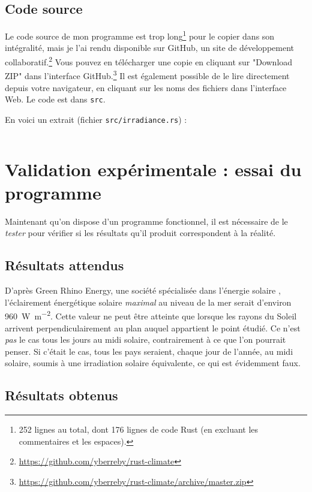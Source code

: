 \documentclass[12pt]{article}
\begin{document}
\FloatBarrier
\subsection{Code source}

Le code source de mon programme est trop long\footnote{252 lignes au total, dont 176 lignes de code Rust (en excluant les commentaires et les espaces).} pour le copier dans son intégralité, mais je l'ai rendu disponible sur GitHub, un site de développement collaboratif.\footnote{\url{https://github.com/yberreby/rust-climate}}
Vous pouvez en télécharger une copie en cliquant sur "Download ZIP" dans l'interface GitHub.\footnote{\url{https://github.com/yberreby/rust-climate/archive/master.zip}}
Il est également possible de le lire directement depuis votre navigateur, en cliquant sur les noms des fichiers dans l'interface Web.
Le code est dans \texttt{src}.

En voici un extrait (fichier \texttt{src/irradiance.rs}) :

\inputminted[linenos]{rust}{rust-climate/src/irradiance.rs}



\clearpage
\section{Validation expérimentale : essai du programme}

Maintenant qu'on dispose d'un programme fonctionnel, il est nécessaire de le \emph{tester} pour vérifier si les résultats qu'il produit correspondent à la réalité.

\subsection{Résultats attendus}

D'après Green Rhino Energy, une société spécialisée dans l'énergie solaire \cite{green_rhino_irradiance}, l'éclairement énergétique solaire \emph{maximal} au niveau de la mer serait d'environ \SI{960}{\watt\per\square\meter}.
Cette valeur ne peut être atteinte que lorsque les rayons du Soleil arrivent perpendiculairement au plan auquel appartient le point étudié.
Ce n'est \emph{pas} le cas tous les jours au midi solaire, contrairement à ce que l'on pourrait penser.
Si c'était le cas, tous les pays seraient, chaque jour de l'année, au midi solaire, soumis à une irradiation solaire équivalente, ce qui est évidemment faux.


\subsection{Résultats obtenus}
\end{document}
